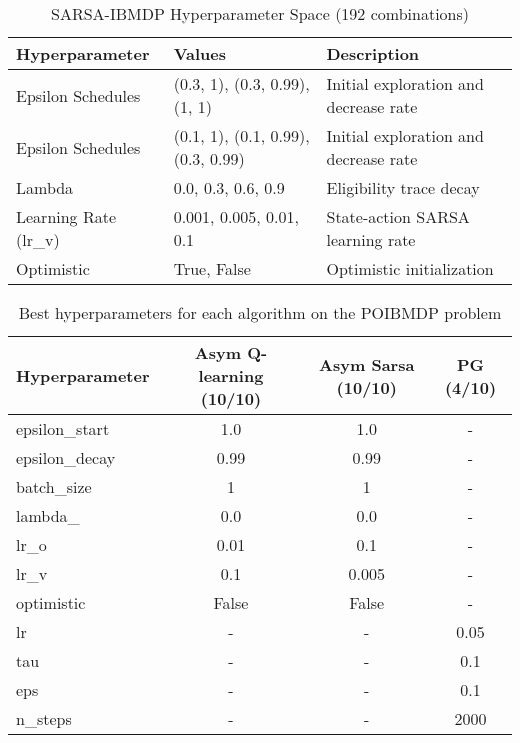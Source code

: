 \begin{table}
\small
\centering
\caption{SARSA-IBMDP Hyperparameter Space (192 combinations)}
\begin{tabular}{lll}
\toprule
\textbf{Hyperparameter} & \textbf{Values} & \textbf{Description} \\
\midrule
Epsilon Schedules & (0.3, 1), (0.3, 0.99), (1, 1) & Initial exploration and decrease rate \\
Epsilon Schedules & (0.1, 1), (0.1, 0.99), (0.3, 0.99) & Initial exploration and decrease rate \\
Lambda & 0.0, 0.3, 0.6, 0.9 & Eligibility trace decay \\
Learning Rate (lr\_v) & 0.001, 0.005, 0.01, 0.1 & State-action SARSA learning rate \\
Optimistic & True, False & Optimistic initialization \\
\bottomrule
\end{tabular}
\end{table}


\begin{table}
    \centering
    \begin{tabular}{|l|c|c|c|}
    \textbf{Hyperparameter} & \textbf{Asym Q-learning (10/10)} & \textbf{Asym Sarsa (10/10)} & \textbf{PG (4/10)} \\
    \toprule
    epsilon\_start & 1.0 & 1.0 & - \\
    epsilon\_decay & 0.99 & 0.99 & - \\
    batch\_size & 1 & 1 & - \\
    lambda\_ & 0.0 & 0.0 & - \\
    lr\_o & 0.01 & 0.1 & - \\
    lr\_v & 0.1 & 0.005 & - \\
    optimistic & False & False & - \\
    lr & - & - & 0.05 \\
    tau & - & - & 0.1 \\
    eps & - & - & 0.1 \\
    n\_steps & - & - & 2000 \\
    \bottomrule
    \end{tabular}
    \caption{Best hyperparameters for each algorithm on the POIBMDP problem}
    \label{tab:algorithm-hyperparameters}
    \end{table}

